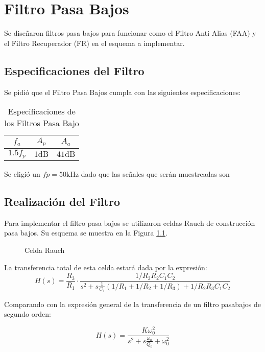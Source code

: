 \chapter{Filtro Pasa Bajos}
Se diseñaron filtros pasa bajos para funcionar como el Filtro Anti Alias (FAA) y el Filtro Recuperador (FR) en el esquema a implementar.
\section{Especificaciones del Filtro}
Se pidió que el Filtro Pasa Bajos cumpla con las siguientes especificaciones:

\begin{table}[ht]
    \centering
    \begin{tabular}{|c|c|c|}
        \hline
        $f_a$  &   $A_p$   &   $A_a$    \\
        \hline
        $1.5 f_p$   &   $1 \si{\deci\bel}$ &   $41 \si{\deci\bel}$    \\
        \hline
    \end{tabular}
    \caption{Especificaciones de los Filtros Pasa Bajo}
\end{table}

Se eligió un $fp = 50 \si{\kilo\hertz}$ dado que las señales que serán muestreadas son 

\section{Realización del Filtro}

Para implementar el filtro pasa bajos se utilizaron celdas Rauch de construcción pasa bajos. Su esquema se muestra en la Figura \ref{fig:Rauch-Cell}.

\begin{figure}[ht]
    \centering
    
    \caption{Celda Rauch}
    \label{fig:Rauch-Cell}
\end{figure}

La transferencia total de esta celda estará dada por la expresión:
\begin{equation}
    H(s)=\frac{R_3}{R_1}\cdot\frac{1/R_3 R_2 C_1 C_2}{s^2+s \frac{1}{C_1}(1/R_1+1/R_2+1/R_3)+1/R_2 R_3 C_1 C_2}
\end{equation}

Comparando con la expresión general de la transferencia de un filtro pasabajos de segundo orden:

\begin{equation*}
    H(s)=\frac{K \omega_0^2}{s^2 +s\frac{\omega_0}{Q_0}+\omega_0 ^2}
\end{equation*}

